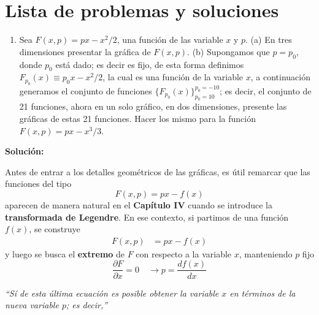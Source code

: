 \documentclass{article}
\newenvironment{AGbox}[1][7]%
{%
  \begin{tcolorbox}[
    enhanced, breakable,
    colframe=AppleGreen,
    colback=AppleGreen!#1,
    boxrule=1pt,
    borderline west={2mm}{-10mm}{AppleGreen},
    sharp corners=southwest,
    left=14pt,right=14pt,top=10pt,bottom=10pt,
     boxsep=6pt,
  ]%
}{%
  \end{tcolorbox}%
}
\begin{document}
\section*{\textcolor{Tarawera}{\textbf{Lista de problemas y soluciones}}}

\setlength{\columnsep}{2cm}

\begin{AGbox}[8]
\begin{enumerate}[label={{\textcolor{trueblue}{\textbf{Pr.} 4.1}}}]
  \item Sea $F(x,p) = px - x^{2}/2$, una función de las variable $x$ y $p$. (a) En tres dimensiones presentar la gráfica de $F(x,p)$. (b) Supongamos que $p = p_{0}$, donde $p_{0}$ está dado; es decir es fijo, de esta forma definimos $F_{p_{0}}(x) \equiv p_{0}x - x^{2}/2$, la cual es una función de la variable $x$, a continuación generamos el conjunto de funciones $\{F_{p_{0}}(x)\}_{p_{0}=10}^{p_{0}=-10}$; es decir, el conjunto de 21 funciones, ahora en un solo gráfico, en dos dimensiones, presente las gráficas de estas 21 funciones. Hacer los mismo para la función $F(x,p) = px - x^{3}/3$.
\end{enumerate}
\end{AGbox}
\vspace{0.5cm}

\textcolor{Cinnabar}{\textbf{Solución:}} \vspace{0.5cm}

Antes de entrar a los detalles geométricos de las gráficas, es útil remarcar que las
funciones del tipo
\[
F(x,p) = px - f(x)
\]
aparecen de manera natural en el \textbf{Capítulo IV} cuando se introduce la
\textcolor{trueblue}{\textbf{transformada de Legendre}}.  
En ese contexto, si partimos de una función \(f(x)\), se construye
\begin{equation}
\begin{split}
F(x,p) &= px - f(x)
\end{split}\label{eq:legendre-general}
\end{equation}
y luego se busca el \textbf{extremo} de \(F\) con respecto a la variable \(x\), manteniendo
\(p\) fijo  
\[
\frac{\partial F}{\partial x} = 0 \quad \to p = \frac{ df(x)}{dx}
\]

\emph{``Sí de esta última ecuación es posible obtener la variable $x$ en términos de la nueva variable $p$; es decir,''}
\end{document}
